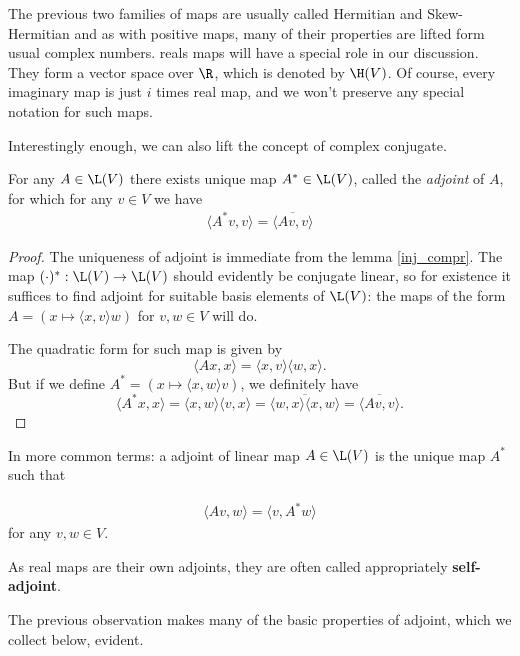 The previous two families of maps are usually called Hermitian and Skew-Hermitian and as with positive maps, many of their properties are lifted form usual complex numbers. reals maps will have a special role in our discussion. They form a vector space over $\R$, which is denoted by $\H(V)$. Of course, every imaginary map is just $i$ times real map, and we won't preserve any special notation for such maps.

Interestingly enough, we can also lift the concept of complex conjugate.

\begin{lause}
	For any $A \in \L(V)$ there exists unique map $A^{*} \in \L(V)$, called the \textit{adjoint} of $A$, for which for any $v \in V$ we have
	\begin{align*}
	\langle A^{*} v, v\rangle = \overline{\langle A v, v \rangle}
	\end{align*}
\end{lause}
\begin{proof}
	The uniqueness of adjoint is immediate from the lemma \ref{inj_compr}. The map $(\cdot)^{*} : \L(V) \to \L(V)$ should evidently be conjugate linear, so for existence it suffices to find adjoint for suitable basis elements of $\L(V)$: the maps of the form $A = (x \mapsto \langle x, v \rangle w)$ for $v, w \in V$ will do.

	The quadratic form for such map is given by
	\[
		\langle A x, x \rangle = \langle x, v \rangle \langle w, x \rangle.
	\]
	But if we define $A^{*} = (x \mapsto \langle x, w \rangle v)$, we definitely have
	\[
		\langle A^{*} x, x \rangle = \langle x, w \rangle \langle v, x \rangle = \overline{\langle w, x \rangle \langle x, w \rangle} = \overline{\langle A v, v \rangle}.
	\]
\end{proof}

In more common terms: a adjoint of linear map $A \in \L(V)$ is the unique map $A^{*}$ such that

\begin{align*}
	\langle A v, w \rangle = \langle v, A^{*} w \rangle
\end{align*}
for any $v, w \in V$.

As real maps are their own adjoints, they are often called appropriately \textbf{self-adjoint}.

The previous observation makes many of the basic properties of adjoint, which we collect below, evident.

